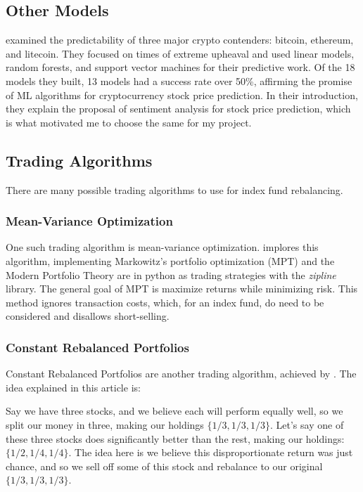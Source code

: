 \documentclass[10pt,twocolumn]{article}
\begin{document}
\subsection{Other Models}

 examined the predictability of three major crypto contenders: bitcoin, ethereum, and litecoin. They focused on times of extreme upheaval and used linear models, random forests, and support vector machines for their predictive work. Of the 18 models they built, 13 models had a success rate over 50\%, affirming the promise of ML algorithms for cryptocurrency stock price prediction. In their introduction, they explain the proposal of sentiment analysis for stock price prediction, which is what motivated me to choose the same for my project.

\subsection{Trading Algorithms}

There are many possible trading algorithms to use for index fund rebalancing. 

\subsubsection{Mean-Variance Optimization}

One such trading algorithm is mean-variance optimization.  implores this algorithm, implementing Markowitz's portfolio optimization (MPT) and the Modern Portfolio Theory are  in python as trading strategies with the \textit{zipline} library. The general goal of MPT is maximize returns while minimizing risk. This method ignores transaction costs, which, for an index fund, do need to be considered and disallows short-selling.

\subsubsection{Constant Rebalanced Portfolios}

Constant Rebalanced Portfolios are another trading algorithm, achieved by . The idea explained in this article is:

Say we have three stocks, and we believe each will perform equally well, so we split our money in three, making our holdings $\{1/3, 1/3, 1/3\}$. Let's say one of these three stocks does significantly better than the rest, making our holdings: $\{1/2, 1/4, 1/4\}$. The idea here is we believe this disproportionate return was just chance, and so we sell off some of this stock and rebalance to our original $\{1/3, 1/3, 1/3\}$.
\end{document}
